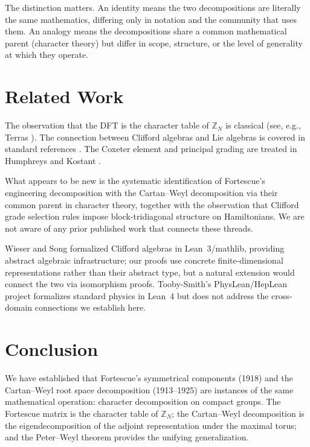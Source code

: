 \documentclass[11pt]{article}
\newcommand{\ZZ}{\mathbb{Z}}
\begin{document}
The distinction matters. An identity means the two decompositions are
literally the same mathematics, differing only in notation and the
community that uses them. An analogy means the decompositions share a
common mathematical parent (character theory) but differ in scope,
structure, or the level of generality at which they operate.

\section{Related Work}
\label{sec:related}

The observation that the DFT is the character table of $\ZZ_N$ is
classical (see, e.g., Terras \cite{terras1999}). The connection between
Clifford algebras and Lie algebras is covered in standard references
\cite{lounesto2001,doran2003}. The Coxeter element and principal grading
are treated in Humphreys \cite{humphreys1990} and Kostant
\cite{kostant1959}.

What appears to be new is the systematic identification of Fortescue's
engineering decomposition with the Cartan--Weyl decomposition via their
common parent in character theory, together with the observation that
Clifford grade selection rules impose block-tridiagonal structure on
Hamiltonians. We are not aware of any prior published work that
connects these threads.

Wieser and Song \cite{wieser2021clifford} formalized Clifford algebras
in Lean~3/mathlib, providing abstract algebraic infrastructure; our
proofs use concrete finite-dimensional representations rather than
their abstract type, but a natural extension would connect the two
via isomorphism proofs. Tooby-Smith's PhysLean/HepLean
project \cite{toobysmith2025physlean} formalizes standard physics in
Lean~4 but does not address the cross-domain connections we establish
here.

\section{Conclusion}
\label{sec:conclusion}

We have established that Fortescue's symmetrical components (1918) and
the Cartan--Weyl root space decomposition (1913--1925) are instances
of the same mathematical operation: character decomposition on compact
groups. The Fortescue matrix is the character table of $\ZZ_N$; the
Cartan--Weyl decomposition is the eigendecomposition of the adjoint
representation under the maximal torus; and the Peter--Weyl theorem
provides the unifying generalization.
\end{document}
